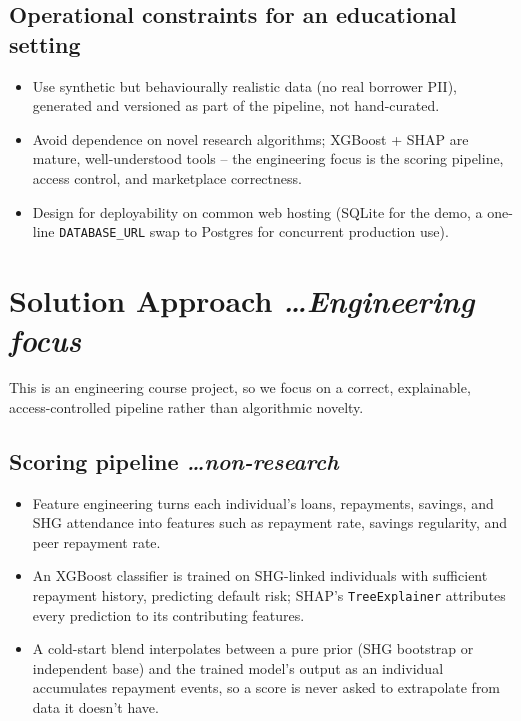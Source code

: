 \documentclass[11pt,a4paper]{article}
\newcommand{\BvrHint}[1]{%
  {\normalfont\normalsize\itshape\hfill #1}}
\begin{document}
\subsection{Operational constraints for an educational
setting}
\begin{itemize}[leftmargin=0.7cm]
    \item Use synthetic but behaviourally realistic data
    (no real borrower PII), generated and versioned as
    part of the pipeline, not hand-curated.
    \item Avoid dependence on novel research algorithms;
    XGBoost + SHAP are mature, well-understood tools --
    the engineering focus is the scoring pipeline, access
    control, and marketplace correctness.
    \item Design for deployability on common web hosting
    (SQLite for the demo, a one-line \texttt{DATABASE\_URL}
    swap to Postgres for concurrent production use).
\end{itemize}

\section{Solution Approach %
\BvrHint{\ldots Engineering focus}}
This is an engineering course project, so we focus on a
correct, explainable, access-controlled pipeline rather
than algorithmic novelty.

\subsection{Scoring pipeline %
\BvrHint{\ldots non-research}}
\begin{itemize}[leftmargin=0.7cm]
    \item Feature engineering turns each individual's
    loans, repayments, savings, and SHG attendance into
    features such as repayment rate, savings regularity,
    and peer repayment rate.
    \item An XGBoost classifier is trained on SHG-linked
    individuals with sufficient repayment history,
    predicting default risk; SHAP's \texttt{TreeExplainer}
    attributes every prediction to its contributing
    features.
    \item A cold-start blend interpolates between a pure
    prior (SHG bootstrap or independent base) and the
    trained model's output as an individual accumulates
    repayment events, so a score is never asked to
    extrapolate from data it doesn't have.
\end{itemize}
\end{document}
